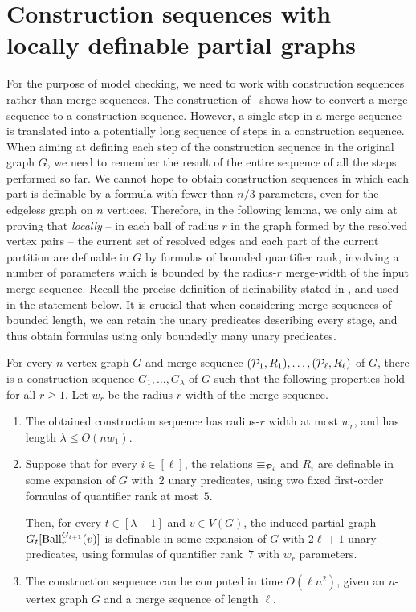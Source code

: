 \section{Construction sequences with locally definable partial graphs}\label{sec:construction-sequences}

For the purpose of model checking, 
we need to work with construction sequences rather than merge sequences. 
The construction of~\cite[Lemma~3.3]{mw-arxiv} shows how to convert a merge sequence to a construction sequence. However, a single step in a merge sequence is translated into a potentially long sequence of steps in a construction sequence. When aiming at defining each step of the construction sequence in the original graph $G$, we need to remember the result of the entire sequence of all the steps performed so far. 
We cannot hope to obtain construction sequences in which each part is definable by a formula with fewer than $n/3$ parameters, even for the edgeless graph on $n$ vertices.
Therefore, in the following lemma, we only aim at proving that \emph{locally} -- in each ball of radius $r$ in the graph formed by the resolved vertex pairs -- the current set of resolved edges and each part of the current partition are definable in $G$ by formulas of bounded quantifier rank, involving a number of parameters which is bounded by the radius-$r$ merge-width of the input merge sequence. Recall the precise definition 
of definability stated in , and used in the statement below.
It is crucial that when considering merge sequences of bounded length, we
can retain the unary predicates describing every stage, and thus obtain formulas using only boundedly many unary predicates.


\begin{lemma}\label{cl:from-merge-to-construction}
    For every $n$-vertex graph $G$ and merge sequence $(\mathcal P_1,R_1),\ldots,(\mathcal P_\ell,R_\ell)$ of $G$, there is a construction sequence $G_1,\ldots,G_\lambda$ of $G$ such that the following properties hold for all $r\ge 1$.
    Let $w_r$ be the radius-$r$ width of the merge sequence. 
    \begin{enumerate}
        \item The obtained construction sequence has radius-$r$ width at most $w_r$, and has length $\lambda\le O(nw_1)$.
        \item Suppose that for every $i\in[\ell]$, the relations $\equiv_{\mathcal P_i}$ and $R_i$ are definable in some expansion of $G$ with~$2$ unary predicates, using two fixed first-order formulas of quantifier rank at most~$5$.

        Then, for every $t\in[\lambda-1]$ and  $v\in V(G)$, the induced partial graph
        $G_t[\operatorname{Ball}^{G_{t+1}}_r(v)]$ is definable in some expansion of $G$
        with $2\ell+1$ unary predicates, using formulas of quantifier rank~$7$ with $w_r$
        parameters.
        
        \item  The construction sequence can be
computed in time $O(\ell n^2)$, given an $n$-vertex graph $G$ and a merge sequence of length $\ell$.    \end{enumerate}
    \end{lemma}


